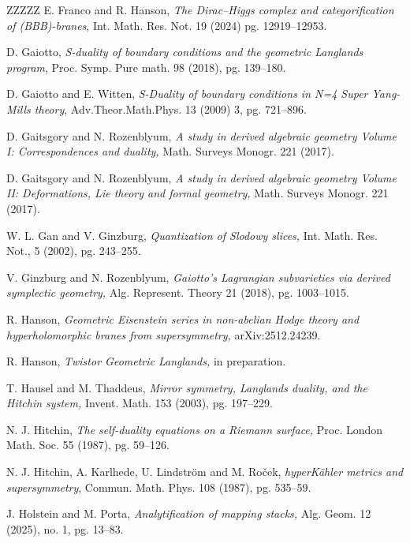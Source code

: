 \documentclass[11pt, a4paper]{amsart}
\numberwithin{equation}{section}
\theoremstyle{definition}
\theoremstyle{remark}
\begin{document}
\begin{thebibliography}{ZZZZZ}
E. Franco and R. Hanson, 
\textit{The Dirac--Higgs complex and categorification of (BBB)-branes}, 
Int. Math. Res. Not. 19 (2024) pg. 12919--12953.

D. Gaiotto, 
\textit{S-duality of boundary conditions and the geometric Langlands program}, 
Proc. Symp. Pure math. 98 (2018), pg. 139--180.

D. Gaiotto and E. Witten, 
\textit{S-Duality of boundary conditions in N=4 Super Yang-Mills theory},     
Adv.Theor.Math.Phys. 13 (2009) 3, pg. 721--896.

D. Gaitsgory and N. Rozenblyum,
\textit{A study in derived algebraic geometry
Volume I: Correspondences and duality,} Math. Surveys Monogr. 221 (2017).

D. Gaitsgory and N. Rozenblyum,
\textit{A study in derived algebraic geometry
Volume II: Deformations, Lie theory and formal
geometry,} Math. Surveys Monogr. 221 (2017).


W. L. Gan and V. Ginzburg,
\textit{Quantization of Slodowy slices,} 
Int. Math. Res. Not., 5 (2002), pg. 243--255.

V. Ginzburg and N. Rozenblyum,
\textit{Gaiotto's Lagrangian subvarieties via derived symplectic geometry,} 
Alg. Represent. Theory 21 (2018), pg. 1003--1015.

R. Hanson,
\textit{Geometric Eisenstein series in non-abelian Hodge theory and hyperholomorphic branes from supersymmetry,}
arXiv:2512.24239.

R. Hanson,
\textit{Twistor Geometric Langlands,} in preparation.




T. Hausel and M. Thaddeus,
\textit{Mirror symmetry, Langlands duality, and the Hitchin system,} 
Invent. Math. 153 (2003), pg. 197--229. 

N. J. Hitchin,
\textit{The self-duality equations on a Riemann surface,}
Proc. London Math. Soc. 55 (1987), pg. 59--126.

N. J. Hitchin, A. Karlhede, U. Lindstr\"om and M. Ro\v{c}ek, 
\textit{hyperKähler metrics and supersymmetry}, Commun. Math. Phys. 108 (1987), pg. 535--59.

J. Holstein and M. Porta, 
\textit{Analytification of mapping stacks,}
Alg. Geom. 12 (2025), no. 1, pg. 13--83.


\end{thebibliography}
\end{document}
